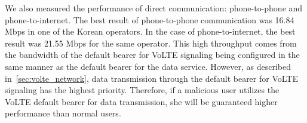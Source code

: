 We also measured the performance of direct communication: phone-to-phone and
phone-to-internet. The best result of phone-to-phone communication was 16.84 Mbps
in one of the Korean operators. In the case of phone-to-internet, the best result was 21.55 Mbps for the
same operator. This high throughput comes from the bandwidth of
the default bearer for VoLTE signaling being configured in the same manner as the default
bearer for the data service.
However, as described in~\autoref{sec:volte_network}, data transmission through
the default bearer for VoLTE signaling has the highest priority. Therefore, if
a malicious user utilizes the VoLTE default bearer for data transmission, she
will be guaranteed higher performance than normal users.



